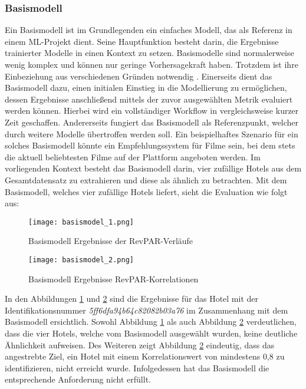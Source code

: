 \subsubsection{Basismodell}
\label{subsubsec:Basismodel}
Ein Basismodell ist im Grundlegenden ein einfaches Modell, das als Referenz in einem ML-Projekt dient. Seine Hauptfunktion besteht darin, die Ergebnisse trainierter Modelle in einen Kontext zu setzen. Basismodelle sind normalerweise wenig komplex und können nur geringe Vorhersagekraft haben. Trotzdem ist ihre Einbeziehung aus verschiedenen Gründen notwendig \cite{Nair.04.04.2022}.
\newline
\newline
Einerseits dient das Basismodell dazu, einen initialen Einstieg in die Modellierung zu ermöglichen, dessen Ergebnisse anschließend mittels der zuvor ausgewählten Metrik evaluiert werden können. Hierbei wird ein vollständiger Workflow in vergleichsweise kurzer Zeit geschaffen. Andererseits fungiert das Basismodell als Referenzpunkt, welcher durch weitere Modelle übertroffen werden soll. Ein beispielhaftes Szenario für ein solches Basismodell könnte ein Empfehlungssystem für Filme sein, bei dem stets die aktuell beliebtesten Filme auf der Plattform angeboten werden.
\newline
\newline
Im vorliegenden Kontext besteht das Basismodell darin, vier zufällige Hotels aus dem Gesamtdatensatz zu extrahieren und diese als ähnlich zu betrachten. Mit dem Basismodell, welches vier zufällige Hotels liefert, sieht die Evaluation wie folgt aus:

\begin{figure}[h]
    \centering
    \texttt{[image: basismodel\_1.png]}
    \caption[Basismodell Ergebnisse der RevPAR-Verläufe]{Basismodell Ergebnisse der RevPAR-Verläufe}
    \label{img:basismodell_1}
\end{figure}

\begin{figure}[h]
    \centering
    \texttt{[image: basismodel\_2.png]}
    \caption[Basismodell Ergebnisse der RevPAR-Korrelationen]{Basismodell Ergebnisse RevPAR-Korrelationen}
    \label{img:basismodell_2}
\end{figure}

In den Abbildungen \ref{img:basismodell_1} und \ref{img:basismodell_2} sind die Ergebnisse für das Hotel mit der Identifikationsnummer \emph{5ff6dfa94b64c82082b03a76} im Zusammenhang mit dem Basismodell ersichtlich. Sowohl Abbildung \ref{img:basismodell_1} als auch Abbildung \ref{img:basismodell_2} verdeutlichen, dass die vier Hotels, welche vom Basismodell ausgewählt wurden, keine deutliche Ähnlichkeit aufweisen. Des Weiteren zeigt Abbildung \ref{img:basismodell_2} eindeutig, dass das angestrebte Ziel, ein Hotel mit einem Korrelationswert von mindestens 0,8 zu identifizieren, nicht erreicht wurde. Infolgedessen hat das Basismodell die entsprechende Anforderung nicht erfüllt.

